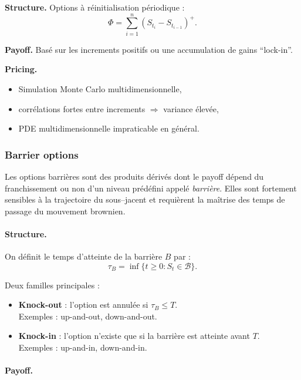 \documentclass[11pt,a4paper]{article}
\newcommand{\1}{\mathbf{1}}
\begin{document}
\textbf{Structure.}
Options à réinitialisation périodique :
\[
\Phi = \sum_{i=1}^n (S_{t_i} - S_{t_{i-1}})^+.
\]

\textbf{Payoff.}
Basé sur les increments positifs ou une accumulation de gains ``lock-in''.

\textbf{Pricing.}
\begin{itemize}
  \item Simulation Monte Carlo multidimensionnelle,
  \item corrélations fortes entre increments $\Rightarrow$ variance élevée,
  \item PDE multidimensionnelle impraticable en général.
\end{itemize}


\subsubsection{Barrier options}

Les options barrières sont des produits dérivés dont le payoff dépend du
franchissement ou non d'un niveau prédéfini appelé \emph{barrière}. Elles sont
fortement sensibles à la trajectoire du sous--jacent et requièrent la maîtrise
des temps de passage du mouvement brownien.

\paragraph{Structure.}

On définit le temps d'atteinte de la barrière $B$ par :
\[
\tau_B = \inf \{ t \ge 0 : S_t \in \mathcal{B} \}.
\]

Deux familles principales :

\begin{itemize}
  \item \textbf{Knock-out} : l'option est annulée si $\tau_B \le T$.
        \\Exemples : up-and-out, down-and-out.

  \item \textbf{Knock-in} : l'option n'existe que si la barrière est atteinte avant $T$.
        \\Exemples : up-and-in, down-and-in.
\end{itemize}

\paragraph{Payoff.}
\end{document}
